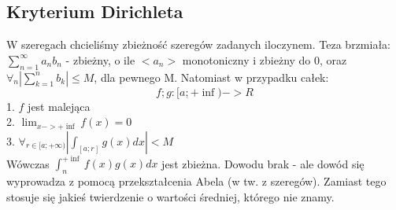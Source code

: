 \documentclass[12pt,a4paper,article]{memoir} %
\begin{document}
\subsection{Kryterium Dirichleta}
W szeregach chcieliśmy zbieżność szeregów zadanych iloczynem. Teza brzmiała: $ \sum_{n=1}^{\infty} a_n b_n $ - zbieżny, o ile $ <a_n> $ monotoniczny i zbieżny do 0, oraz $\forall_n | \sum_{k=1}^n b_k | \leq M $, dla pewnego M. Natomiast w przypadku całek: \\
\[ f; g : [a; +\inf ) -> R \]
1. $f$ jest malejąca \\
2. $\lim_{x->+\inf} f(x) = 0 $ \\
3. $ \forall_{r \in [a; +\infty)} |\int_{[a;r]} g(x)dx| < M $ \\
Wówczas $ \int_n^{+\inf} f(x)g(x)dx$ jest zbieżna.
Dowodu brak - ale dowód się wyprowadza z pomocą przekształcenia Abela (w tw. z szeregów). Zamiast tego stosuje się jakieś twierdzenie o wartości średniej, którego nie znamy. 
\end{document}
